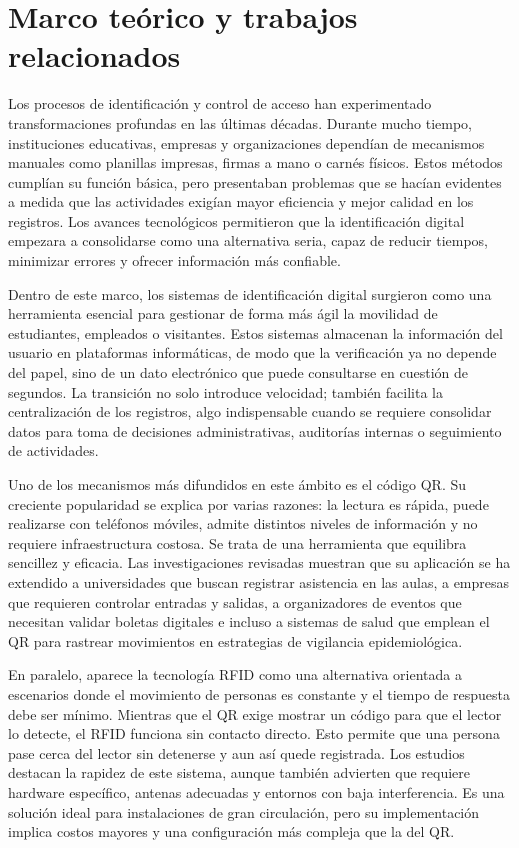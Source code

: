 \section{Marco teórico y trabajos relacionados}
Los procesos de identificación y control de acceso han experimentado transformaciones profundas en las últimas décadas. Durante mucho tiempo, instituciones educativas, empresas y organizaciones dependían de mecanismos manuales como planillas impresas, firmas a mano o carnés físicos. Estos métodos cumplían su función básica, pero presentaban problemas que se hacían evidentes a medida que las actividades exigían mayor eficiencia y mejor calidad en los registros. Los avances tecnológicos permitieron que la identificación digital empezara a consolidarse como una alternativa seria, capaz de reducir tiempos, minimizar errores y ofrecer información más confiable.

Dentro de este marco, los sistemas de identificación digital surgieron como una herramienta esencial para gestionar de forma más ágil la movilidad de estudiantes, empleados o visitantes. Estos sistemas almacenan la información del usuario en plataformas informáticas, de modo que la verificación ya no depende del papel, sino de un dato electrónico que puede consultarse en cuestión de segundos. La transición no solo introduce velocidad; también facilita la centralización de los registros, algo indispensable cuando se requiere consolidar datos para toma de decisiones administrativas, auditorías internas o seguimiento de actividades.

Uno de los mecanismos más difundidos en este ámbito es el código QR. Su creciente popularidad se explica por varias razones: la lectura es rápida, puede realizarse con teléfonos móviles, admite distintos niveles de información y no requiere infraestructura costosa. Se trata de una herramienta que equilibra sencillez y eficacia. Las investigaciones revisadas muestran que su aplicación se ha extendido a universidades que buscan registrar asistencia en las aulas, a empresas que requieren controlar entradas y salidas, a organizadores de eventos que necesitan validar boletas digitales e incluso a sistemas de salud que emplean el QR para rastrear movimientos en estrategias de vigilancia epidemiológica.

En paralelo, aparece la tecnología RFID como una alternativa orientada a escenarios donde el movimiento de personas es constante y el tiempo de respuesta debe ser mínimo. Mientras que el QR exige mostrar un código para que el lector lo detecte, el RFID funciona sin contacto directo. Esto permite que una persona pase cerca del lector sin detenerse y aun así quede registrada. Los estudios destacan la rapidez de este sistema, aunque también advierten que requiere hardware específico, antenas adecuadas y entornos con baja interferencia. Es una solución ideal para instalaciones de gran circulación, pero su implementación implica costos mayores y una configuración más compleja que la del QR.


